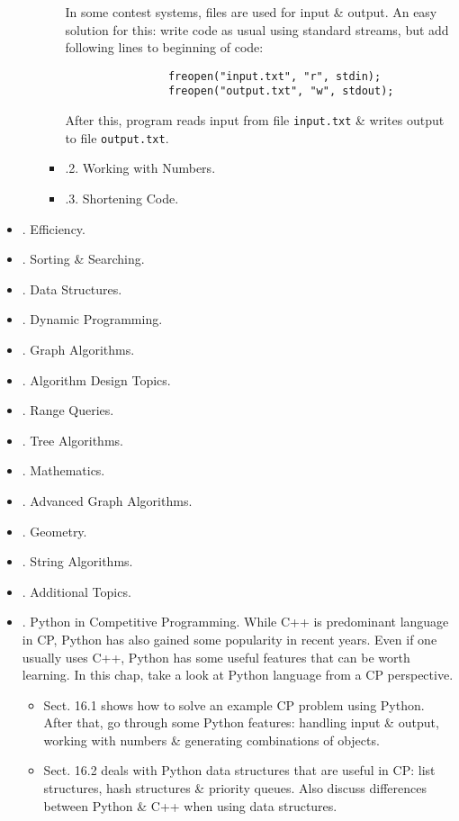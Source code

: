 \documentclass{article}
\begin{document}
\begin{itemize}
\begin{itemize}
\begin{itemize}
			In some contest systems, files are used for input \& output. An easy solution for this: write code as usual using standard streams, but add following lines to beginning of code:
			\begin{verbatim}
				freopen("input.txt", "r", stdin);
				freopen("output.txt", "w", stdout);
			\end{verbatim}
			After this, program reads input from file {\tt input.txt} \& writes output to file {\tt output.txt}.
			\item {.2. Working with Numbers.}
			\item {.3. Shortening Code.}
		\end{itemize}
	\end{itemize}
	\item {. Efficiency.}
	\item {. Sorting \& Searching.}
	\item {. Data Structures.}
	\item {. Dynamic Programming.}
	\item {. Graph Algorithms.}
	\item {. Algorithm Design Topics.}
	\item {. Range Queries.}
	\item {. Tree Algorithms.}
	\item {. Mathematics.}
	\item {. Advanced Graph Algorithms.}
	\item {. Geometry.}
	\item {. String Algorithms.}
	\item {. Additional Topics.}
	\item {. Python in Competitive Programming.} While C++ is predominant language in CP, Python has also gained some popularity in recent years. Even if one usually uses C++, Python has some useful features that can be worth learning. In this chap, take a look at Python language from a CP perspective.
	\begin{itemize}
		\item Sect. 16.1 shows how to solve an example CP problem using Python. After that, go through some Python features: handling input \& output, working with numbers \& generating combinations of objects.
		\item Sect. 16.2 deals with Python data structures that are useful in CP: list structures, hash structures \& priority queues. Also discuss differences between Python \& C++ when using data structures.

\end{itemize}
\end{itemize}
\end{document}
